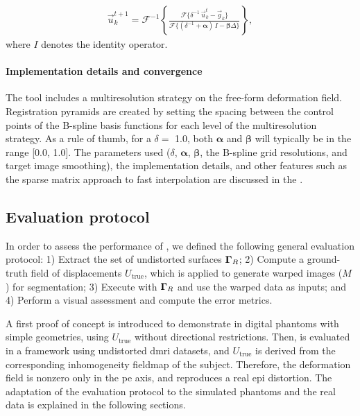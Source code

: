   \begin{align}
  \vec{u}_k^{t+1} = \mathcal{F}^{-1}\left\{ \frac{\mathcal{F}\{\delta^{-1} \, \vec{u}_k^t - \vec{g}_k\} }
                    {\mathcal{F}\{(\delta^{-1} + \boldsymbol{\alpha})\, I - \boldsymbol{\beta}\Delta\}} \right\},
  \label{eq:regseg-update_equation}
  \end{align}
  where $I$ denotes the identity operator.


\paragraph*{Implementation details and convergence}%
\label{sec:regseg-conv_report}
The \regseg{} tool includes a multiresolution strategy on the free-form deformation field.
Registration pyramids are created by setting the spacing between the control points of the B-spline basis
  functions for each level of the multiresolution strategy.
As a rule of thumb, for a $\delta =$ 1.0, both $\boldsymbol{\alpha}$
  and $\boldsymbol{\beta}$ will typically be in the range [0.0, 1.0].
The parameters used ($\delta$, $\boldsymbol{\alpha}$, $\boldsymbol{\beta}$, the B-spline grid resolutions,
  and target image smoothing), the implementation details, and other features such as the sparse matrix
  approach to fast interpolation are discussed in the .

\subsection{Evaluation protocol}\label{sec:regseg-evaluation_protocol}
In order to assess the performance of \regseg{}, we defined the following general
  evaluation protocol:
1) Extract the set of undistorted surfaces $\boldsymbol{\Gamma}_R$;
2) Compute a ground-truth field of displacements $U_\text{true}$, which is applied to
  generate warped images ($M$) for segmentation;
3) Execute \regseg{} with $\boldsymbol{\Gamma}_R$ and use the warped data as inputs; and
4) Perform a visual assessment and compute the error metrics.

A first proof of concept is introduced to demonstrate \regseg{} in digital phantoms
  with simple geometries, using $U_\text{true}$ without directional restrictions.
Then, \regseg{} is evaluated in a framework using undistorted \gls*{dmri} datasets,
  and $U_\text{true}$ is derived from the corresponding inhomogeneity fieldmap of
  the subject.
Therefore, the deformation field is nonzero only in the \acrfull*{pe} axis,
  and reproduces a real \gls*{epi} distortion.
The adaptation of the evaluation protocol to the simulated phantoms and the real data is
  explained in the following sections.

